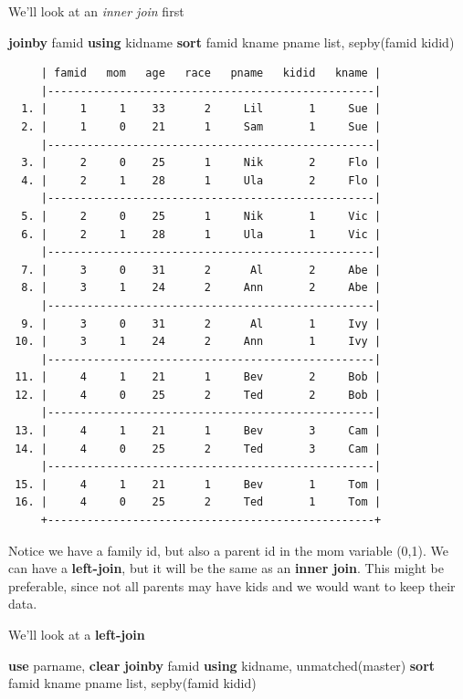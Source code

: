 \documentclass[
]{book}
\newenvironment{Shaded}{\begin{snugshade}}{\end{snugshade}}
\newcommand{\KeywordTok}[1]{\textcolor[rgb]{0.13,0.29,0.53}{\textbf{#1}}}
\newcommand{\NormalTok}[1]{#1}
\newcommand{\OtherTok}[1]{\textcolor[rgb]{0.56,0.35,0.01}{#1}}
\begin{document}
We'll look at an \emph{inner join} first

\begin{Shaded}
\begin{Highlighting}[]
\KeywordTok{joinby}\NormalTok{ famid }\KeywordTok{using}\NormalTok{ kidname}
\KeywordTok{sort}\NormalTok{ famid kname pname}
\OtherTok{list}\NormalTok{, sepby(famid kidid)}
\end{Highlighting}
\end{Shaded}

\begin{verbatim}
     | famid   mom   age   race   pname   kidid   kname |
     |--------------------------------------------------|
  1. |     1     1    33      2     Lil       1     Sue |
  2. |     1     0    21      1     Sam       1     Sue |
     |--------------------------------------------------|
  3. |     2     0    25      1     Nik       2     Flo |
  4. |     2     1    28      1     Ula       2     Flo |
     |--------------------------------------------------|
  5. |     2     0    25      1     Nik       1     Vic |
  6. |     2     1    28      1     Ula       1     Vic |
     |--------------------------------------------------|
  7. |     3     0    31      2      Al       2     Abe |
  8. |     3     1    24      2     Ann       2     Abe |
     |--------------------------------------------------|
  9. |     3     0    31      2      Al       1     Ivy |
 10. |     3     1    24      2     Ann       1     Ivy |
     |--------------------------------------------------|
 11. |     4     1    21      1     Bev       2     Bob |
 12. |     4     0    25      2     Ted       2     Bob |
     |--------------------------------------------------|
 13. |     4     1    21      1     Bev       3     Cam |
 14. |     4     0    25      2     Ted       3     Cam |
     |--------------------------------------------------|
 15. |     4     1    21      1     Bev       1     Tom |
 16. |     4     0    25      2     Ted       1     Tom |
     +--------------------------------------------------+
\end{verbatim}

Notice we have a family id, but also a parent id in the mom variable (0,1). We can have a \textbf{left-join}, but it will be the same as an \textbf{inner join}.
This might be preferable, since not all parents may have kids and we would want to keep their data.

We'll look at a \textbf{left-join}

\begin{Shaded}
\begin{Highlighting}[]
\KeywordTok{use}\NormalTok{ parname, }\KeywordTok{clear}
\KeywordTok{joinby}\NormalTok{ famid }\KeywordTok{using}\NormalTok{ kidname, unmatched(master)}
\KeywordTok{sort}\NormalTok{ famid kname pname}
\OtherTok{list}\NormalTok{, sepby(famid kidid)}
\end{Highlighting}
\end{Shaded}
\end{document}
